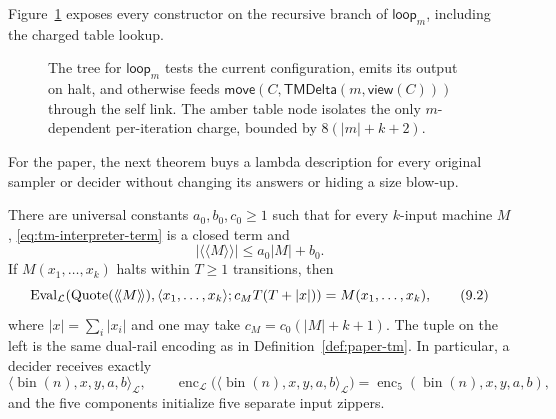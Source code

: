 Figure~\ref{fig:loop-term} exposes every constructor on the recursive branch
of \(\mathsf{loop}_m\), including the charged table lookup.
\begin{figure}[t]
\centering

\caption{The tree for \(\mathsf{loop}_m\) tests the current configuration, emits its output on halt, and otherwise feeds \(\mathsf{move}(C,\mathsf{TMDelta}(m,\mathsf{view}(C)))\) through the self link.  The amber table node isolates the only \(m\)-dependent per-iteration charge, bounded by \(8(|m|+k+2)\).}
\label{fig:loop-term}
\end{figure}

For the paper, the next theorem buys a lambda description for every original
sampler or decider without changing its answers or hiding a size blow-up.
\begin{theorem}
\label{thm:tm-to-l}\enspace%
There are universal constants \(a_0,b_0,c_0\geq1\) such that for every
\(k\)-input machine \(M\), \eqref{eq:tm-interpreter-term} is a closed term and
\[
 |\langle\!\langle M\rangle\!\rangle|\leq a_0|M|+b_0.
\]
If \(M(x_1,\ldots,x_k)\) halts within \(T\geq1\) transitions, then
\[
 \operatorname{Eval}_{\mathcal L}\!\left(
   \operatorname{Quote}(\langle\!\langle M\rangle\!\rangle),
   \langle x_1,\ldots,x_k\rangle;
   c_M T(T+|x|)\right)=M(x_1,\ldots,x_k),
\tag{9.2}\label{eq:tm-to-l-bound}
\]
where \(|x|=\sum_i|x_i|\) and one may take
\(c_M=c_0(|M|+k+1)\).  The tuple on the left is the same dual-rail encoding as
in Definition~\ref{def:paper-tm}.  In particular, a decider receives exactly
\[
 \langle\operatorname{bin}(n),x,y,a,b\rangle_{\mathcal L},
 \qquad
 \operatorname{enc}_{\mathcal L}\bigl(\langle\operatorname{bin}(n),x,y,a,b
   \rangle_{\mathcal L}\bigr)
 =\operatorname{enc}_5(\operatorname{bin}(n),x,y,a,b),
\]
and the five components initialize five separate input zippers.
\end{theorem}

